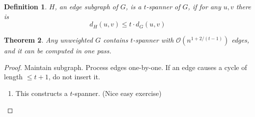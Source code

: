 \documentclass[11pt]{article}
\newtheorem{theorem}{Theorem}
\newtheorem{definition}[theorem]{Definition}
\newcommand{\bigo}{\mathcal{O}}
\begin{document}
\begin{definition}
$H$, an edge subgraph of $G$, is a $t$-spanner of $G$, if for any $u,v$ there is
$$d_H(u,v) \le t \cdot d_G(u,v)$$
\end{definition}

\begin{theorem}
Any unweighted $G$ contains $t$-spanner with $\bigo(n^{1+2/(t-1)})$ edges, and it can be computed in one pass.
\end{theorem}
\begin{proof}
Maintain subgraph. Process edges one-by-one. If an edge causes a cycle of length $\le t+1$, do not insert it.
\begin{enumerate}
\item This constructs a $t$-spanner. (Nice easy exercise) \\


\end{enumerate}
\end{proof}
\end{document}
